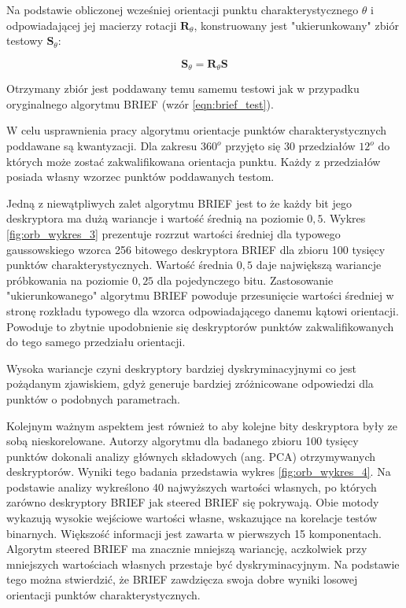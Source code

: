 Na podstawie obliczonej wcześniej orientacji punktu charakterystycznego $\theta$ i odpowiadającej jej macierzy rotacji $\textbf{R}_{\theta}$, konstruowany jest "ukierunkowany" zbiór testowy $\textbf{S}_{\theta}$:

\begin{equation}
\textbf{S}_\theta = \textbf{R}_\theta \textbf{S}
\end{equation}

Otrzymany zbiór jest poddawany temu samemu testowi jak w przypadku oryginalnego algorytmu BRIEF (wzór \ref{eqn:brief_test}).

W celu usprawnienia pracy algorytmu orientacje punktów charakterystycznych poddawane są kwantyzacji. Dla zakresu $360^o$ przyjęto się 30 przedziałów $12^o$ do których może zostać zakwalifikowana orientacja punktu. Każdy z przedziałów posiada własny wzorzec punktów poddawanych testom.

Jedną z niewątpliwych zalet algorytmu BRIEF jest to że każdy bit jego deskryptora ma dużą wariancje i wartość średnią na poziomie $0,5$. Wykres \ref{fig:orb_wykres_3} prezentuje rozrzut wartości średniej dla typowego gaussowskiego wzorca 256 bitowego deskryptora BRIEF dla zbioru 100 tysięcy punktów charakterystycznych. Wartość średnia $0,5$ daje największą wariancje próbkowania na poziomie $0,25$ dla pojedynczego bitu. Zastosowanie "ukierunkowanego" algorytmu BRIEF powoduje przesunięcie wartości średniej w stronę rozkładu typowego dla wzorca odpowiadającego danemu kątowi orientacji. Powoduje to zbytnie upodobnienie się deskryptorów punktów zakwalifikowanych do tego samego przedziału orientacji.

Wysoka wariancje czyni deskryptory bardziej dyskryminacyjnymi co jest pożądanym zjawiskiem, gdyż generuje bardziej zróżnicowane odpowiedzi dla punktów o podobnych parametrach. 

Kolejnym ważnym aspektem  jest również to aby kolejne bity deskryptora były ze sobą nieskorelowane. Autorzy algorytmu dla badanego zbioru 100 tysięcy punktów dokonali analizy głównych składowych (ang. PCA) otrzymywanych deskryptorów. Wyniki tego badania przedstawia wykres \ref{fig:orb_wykres_4}. Na podstawie analizy wykreślono 40 najwyższych wartości własnych, po których zarówno deskryptory BRIEF jak steered BRIEF się pokrywają. Obie motody wykazują wysokie wejściowe wartości własne, wskazujące na korelacje testów binarnych. Większość informacji jest zawarta w pierwszych 15 komponentach. Algorytm steered BRIEF ma znacznie mniejszą wariancję, aczkolwiek przy mniejszych wartościach własnych przestaje być dyskryminacyjnym. Na podstawie tego można stwierdzić, że BRIEF zawdzięcza swoja dobre wyniki losowej orientacji punktów charakterystycznych.

